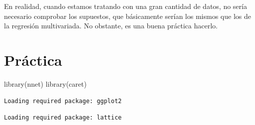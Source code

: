 \documentclass[
  letterpaper,
  DIV=11,
  numbers=noendperiod]{scrartcl}
\newenvironment{Shaded}{\begin{snugshade}}{\end{snugshade}}
\newcommand{\AttributeTok}[1]{\textcolor[rgb]{0.40,0.45,0.13}{#1}}
\newcommand{\DecValTok}[1]{\textcolor[rgb]{0.68,0.00,0.00}{#1}}
\newcommand{\FloatTok}[1]{\textcolor[rgb]{0.68,0.00,0.00}{#1}}
\newcommand{\FunctionTok}[1]{\textcolor[rgb]{0.28,0.35,0.67}{#1}}
\newcommand{\NormalTok}[1]{\textcolor[rgb]{0.00,0.23,0.31}{#1}}
\newcommand{\OtherTok}[1]{\textcolor[rgb]{0.00,0.23,0.31}{#1}}
\newcommand{\SpecialCharTok}[1]{\textcolor[rgb]{0.37,0.37,0.37}{#1}}
\newcommand{\StringTok}[1]{\textcolor[rgb]{0.13,0.47,0.30}{#1}}
\begin{document}
En realidad, cuando estamos tratando con una gran cantidad de datos, no
sería necesario comprobar los supuestos, que básicamente serían los
mismos que los de la regresión multivariada. No obstante, es una buena
práctica hacerlo.

\hypertarget{pruxe1ctica}{%
\section{Práctica}\label{pruxe1ctica}}

\begin{Shaded}
\begin{Highlighting}[]
\FunctionTok{library}\NormalTok{(nnet)}
\FunctionTok{library}\NormalTok{(caret)}
\end{Highlighting}
\end{Shaded}

\begin{verbatim}
Loading required package: ggplot2
\end{verbatim}

\begin{verbatim}
Loading required package: lattice
\end{verbatim}

\begin{Shaded}
\end{Shaded}
\end{document}
